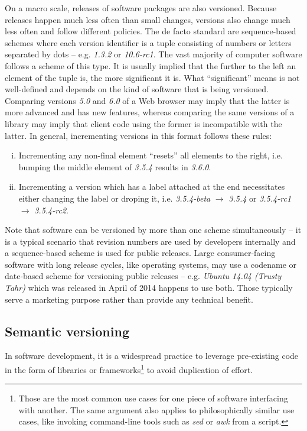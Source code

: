 \documentclass{l4proj}
\begin{document}
On a macro scale, releases of software packages are also versioned.
Because releases happen much less often than small changes, versions
also change much less often and follow different policies. The de
facto standard are sequence-based schemes where each version
identifier is a tuple consisting of numbers or letters separated by
dots -- e.g. \textit{1.3.2} or \textit{10.6-rc1}. The vast majority of
computer software follows a scheme of this type. It is usually implied
that the further to the left an element of the tuple is, the more
significant it is. What ``significant'' means is not well-defined and
depends on the kind of software that is being versioned. Comparing
versions \textit{5.0} and \textit{6.0} of a Web browser may imply that
the latter is more advanced and has new features, whereas comparing
the same versions of a library may imply that client code using the
former is incompatible with the latter. In general, incrementing
versions in this format follows these rules:
\begin{enumerate}[(i)]
\item Incrementing any non-final element ``resets'' all elements to
the right, i.e. bumping the middle element of \textit{3.5.4} results
in \textit{3.6.0}.
\item Incrementing a version which has a label attached at the end
necessitates either changing the label or droping it, i.e.
\textit{3.5.4-beta} $\rightarrow$ \textit{3.5.4} or \textit{3.5.4-rc1}
$\rightarrow $ \textit{3.5.4-rc2}.
\end{enumerate}

Note that software can be versioned by more than one scheme
simultaneously -- it is a
typical scenario that revision numbers are used by developers
internally and a sequence-based scheme is used for public releases.
Large consumer-facing software with long release cycles, like
operating systems, may use a codename or date-based scheme for
versioning public releases -- e.g. \textit{Ubuntu 14.04 (Trusty Tahr)}
which was released in April of 2014 happens to use both. Those
typically serve a marketing purpose rather than provide any technical
benefit.

\subsection{Semantic versioning}

In software development, it is a widespread practice to leverage
pre-existing code in the form of libraries or
frameworks\footnote{Those are the most common use cases for one piece
of software interfacing with another. The same argument also applies
to philosophically similar use cases, like invoking command-line tools
such as \textit{sed} or \textit{awk} from a script.} to avoid
duplication of effort.
\end{document}
